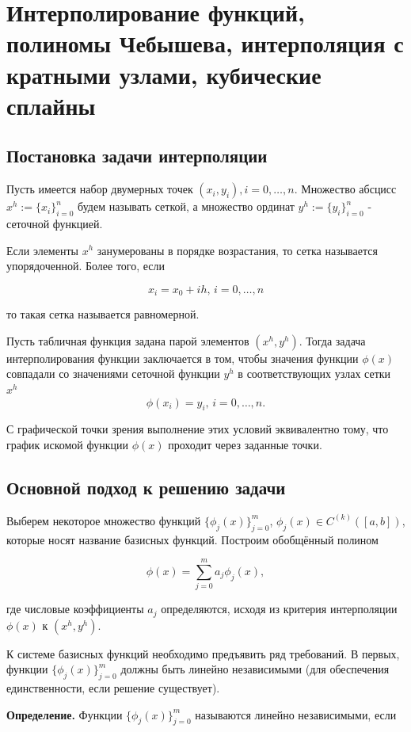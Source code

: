 \section{Интерполирование функций, полиномы Чебышева, интерполяция с кратными узлами, кубические сплайны}
\label{sec:interpolation-chebyshev-hermite-splines}
\subsection{Постановка задачи интерполяции}

Пусть имеется набор двумерных точек \( (x_i, y_i), i = 0, \ldots, n \). Множество абсцисс \( x^h := \{x_i\}_{i=0}^n \) будем называть сеткой, а множество ординат \( y^h := \{y_i\}_{i=0}^n \) - сеточной функцией.

Если элементы \( x^h \) занумерованы в порядке возрастания, то сетка называется упорядоченной. Более того, если

$$x_i = x_0 + ih, \, i = 0, \ldots, n$$

то такая сетка называется равномерной.

Пусть табличная функция задана парой элементов \( (x^h, y^h) \). Тогда задача интерполирования функции заключается в том, чтобы значения функции \( \phi(x) \) совпадали со значениями сеточной функции \( y^h \) в соответствующих узлах сетки \( x^h \)
$$ \phi(x_i) = y_i, \, i = 0, \ldots, n. $$

С графической точки зрения выполнение этих условий эквивалентно тому, что график искомой функции \( \phi(x) \) проходит через заданные точки.

\subsection{Основной подход к решению задачи}

Выберем некоторое множество функций \(\{ \phi_j(x) \}_{j=0}^m\), \(\phi_j(x) \in C^{(k)}([a, b])\), которые носят название базисных функций. Построим обобщённый полином

$$\phi(x) = \sum_{j=0}^m a_j \phi_j(x),$$

где числовые коэффициенты \(a_j\) определяются, исходя из критерия интерполяции \(\phi(x)\) к \((x^h, y^h)\).

К системе базисных функций необходимо предъявить ряд требований. В первых, функции \(\{ \phi_j(x) \}_{j=0}^m\) должны быть линейно независимыми (для обеспечения единственности, если решение существует).

\textbf{Определение.} 
Функции \(\{ \phi_j(x) \}_{j=0}^m\) называются линейно независимыми, если


